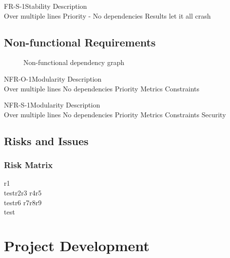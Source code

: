 \documentclass[coverpage]{../custom}
\begin{document}
\FunctionalReq
{FR-S-1}{Stability}
{Description\\Over multiple lines}
{Priority - \musthave \shouldhave \couldhave}
{No dependencies}
{Results}
{let it all crash}

\subsection{Non-functional Requirements}
\label{ssec:nf_req}

\begin{figure}[h!]
	\centering
	\caption{Non-functional dependency graph}
\end{figure}

\NonFunctionalReq
{NFR-O-1}{Modularity}
{Description\\Over multiple lines}
{No dependencies}
{Priority}
{Metrics}
{Constraints}

\NonFunctionalReqS
{NFR-S-1}{Modularity}
{Description\\Over multiple lines}
{No dependencies}
{Priority}
{Metrics}
{Constraints}
{Security}

\subsection{Risks and Issues}
\label{ssec:risks}

\subsubsection{Risk Matrix}

\RiskMatrix
{r1\\test}{r2}{r3}
{r4}{r5\\test}{r6}
{r7}{r8}{r9\\test}

\section{Project Development}
\label{sec:dev}
\end{document}
